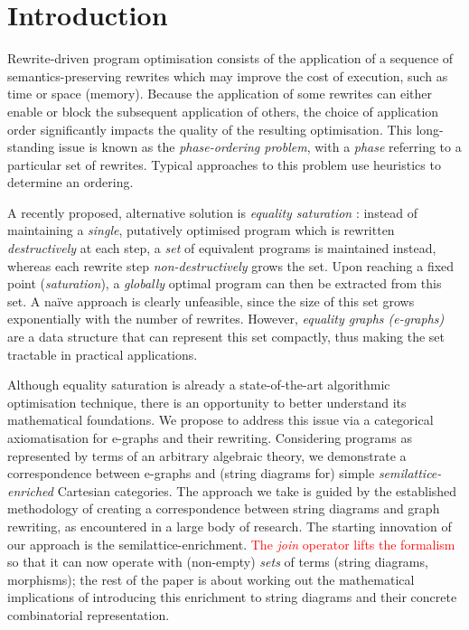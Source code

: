 
\section{Introduction}\label{sec:introduction}


Rewrite-driven program optimisation consists of the application of a sequence of semantics-preserving rewrites which may improve the cost of execution, such as time or space (memory). 
Because the application of some rewrites can either enable or block the subsequent application of others, the choice of application order significantly impacts the quality of the resulting optimisation.  This long-standing issue is known as the \textit{phase-ordering problem}, with a \textit{phase} referring to a particular set of rewrites. Typical approaches to this problem use heuristics to determine an ordering. 

A recently proposed,  alternative solution is \textit{equality saturation} 
\cite{10.1145/1594834.1480915}: instead of maintaining a \textit{single},  putatively optimised program which is rewritten \textit{destructively} at each step, a \textit{set} of equivalent programs is maintained instead, whereas each rewrite step \textit{non-destructively} grows the set.  Upon reaching a fixed point (\textit{saturation}),  a \textit{globally} optimal program can then be extracted from this set.
A na\"ive approach is clearly unfeasible, since the size of this set grows exponentially with the number of rewrites. 
However, \textit{equality graphs (e-graphs)} \cite{EggPaper} are a data structure that can represent this set compactly, thus making the set tractable in practical applications. 

Although equality saturation is already a state-of-the-art algorithmic optimisation technique, there is an opportunity to better understand its mathematical foundations. 
We propose to address this issue via a categorical axiomatisation for e-graphs and their rewriting. 
Considering programs as represented by terms of an arbitrary algebraic theory, we demonstrate a correspondence between e-graphs and (string diagrams for) simple \textit{semilattice-enriched} Cartesian categories. 
The approach we take is guided by the established methodology of creating a correspondence between string diagrams and graph rewriting, as encountered in a large body of research. 
The starting innovation of our approach is the semilattice-enrichment. 
\textcolor{red}{The \textit{join} operator lifts the formalism} so that it can now operate with (non-empty) \textit{sets} of terms (string diagrams, morphisms); the rest of the paper is about working out the mathematical implications of introducing this enrichment to string diagrams and their concrete combinatorial representation. 

